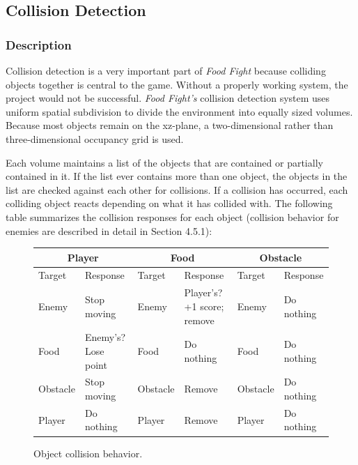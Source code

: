 \documentclass{article}
\begin{document}
\subsection{Collision Detection}

\subsubsection{Description}
Collision detection is a very important part of \textit{Food Fight} because colliding objects together is central to the game. Without a properly working system, the project would not be successful. \textit{Food Fight's} collision detection system uses uniform spatial subdivision to divide the environment into equally sized volumes. Because most objects remain on the xz-plane, a two-dimensional rather than three-dimensional occupancy grid is used. 

Each volume maintains a list of the objects that are contained or partially contained in it. If the list ever contains more than one object, the objects in the list are checked against each other for collisions. If a collision has occurred, each colliding object reacts depending on what it has collided with. The following table summarizes the collision responses for each object (collision behavior for enemies are described in detail in Section 4.5.1): \\

\begin{figure}[H]
    \begin{tabular}{| l | l | l | l | l | l |}
    \hline
    \multicolumn{2}{|c|}{Player} & 
    \multicolumn{2}{|c|}{Food} & 
    \multicolumn{2}{|c|}{Obstacle} \\
    \hline
    Target & Response & Target & Response & Target & Response \\ \hline
    Enemy & Stop moving & Enemy & Player's? +1 score; remove & Enemy & Do nothing \\ \hline
    Food & Enemy's? Lose point & Food & Do nothing & Food & Do nothing \\ \hline
    Obstacle & Stop moving & Obstacle & Remove & Obstacle & Do nothing \\ \hline
    Player & Do nothing & Player & Remove & Player & Do nothing \\
    \hline
    \end{tabular}
    \caption{Object collision behavior.}
\end{figure}
\end{document}
